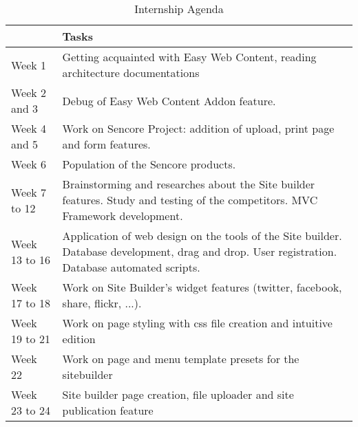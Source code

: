 \begin{table}[!ht]
	\caption{\label{tableau:agenda}Internship Agenda}
	\begin{tabular}{ | l | p{12cm} | }
		\hline
		 & Tasks\\
		\hline
		Week 1	      &		Getting acquainted with Easy Web Content, reading architecture documentations\\	\hline
		Week 2 and 3  &		Debug of Easy Web Content Addon feature.\\	\hline
		Week 4 and 5  &		Work on Sencore Project: addition of upload, print page and form features.\\	\hline
		Week 6        &		Population of the Sencore products.\\	\hline
		Week 7  to 12 &		Brainstorming and researches about the Site builder features. Study and testing of the competitors. MVC Framework development.\\	\hline
		Week 13 to 16 &		Application of web design on the tools of the Site builder. Database development, drag and drop. User registration. Database automated scripts.	\\	\hline
		Week 17	to 18 &		Work on Site Builder's widget features (twitter, facebook, share, flickr, ...).\\	\hline
		Week 19	to 21 &		Work on page styling with css file creation and intuitive edition\\	\hline
		Week 22		  &		Work on page and menu template presets for the sitebuilder\\	\hline
		Week 23	to 24 &		Site builder page creation, file uploader and site publication feature\\	\hline
	\end{tabular}
\end{table}


